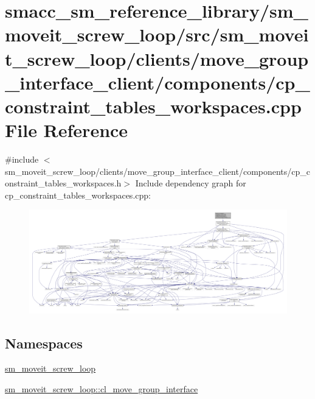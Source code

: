 \hypertarget{sm__moveit__screw__loop_2src_2sm__moveit__screw__loop_2clients_2move__group__interface__client_2bec6cc346eadf5b695aeac84f198fc7f}{}\section{smacc\+\_\+sm\+\_\+reference\+\_\+library/sm\+\_\+moveit\+\_\+screw\+\_\+loop/src/sm\+\_\+moveit\+\_\+screw\+\_\+loop/clients/move\+\_\+group\+\_\+interface\+\_\+client/components/cp\+\_\+constraint\+\_\+tables\+\_\+workspaces.cpp File Reference}
\label{sm__moveit__screw__loop_2src_2sm__moveit__screw__loop_2clients_2move__group__interface__client_2bec6cc346eadf5b695aeac84f198fc7f}
{\ttfamily \#include $<$sm\+\_\+moveit\+\_\+screw\+\_\+loop/clients/move\+\_\+group\+\_\+interface\+\_\+client/components/cp\+\_\+constraint\+\_\+tables\+\_\+workspaces.\+h$>$}\newline
Include dependency graph for cp\+\_\+constraint\+\_\+tables\+\_\+workspaces.\+cpp\+:
\nopagebreak
\begin{figure}[H]
\begin{center}
\leavevmode
\includegraphics[width=350pt]{sm__moveit__screw__loop_2src_2sm__moveit__screw__loop_2clients_2move__group__interface__client_220d482f396186aea9a7eda2c9687f420}
\end{center}
\end{figure}
\subsection*{Namespaces}
\begin{DoxyCompactItemize}
\item 
 \hyperlink{namespacesm__moveit__screw__loop}{sm\+\_\+moveit\+\_\+screw\+\_\+loop}
\item 
 \hyperlink{namespacesm__moveit__screw__loop_1_1cl__move__group__interface}{sm\+\_\+moveit\+\_\+screw\+\_\+loop\+::cl\+\_\+move\+\_\+group\+\_\+interface}
\end{DoxyCompactItemize}
